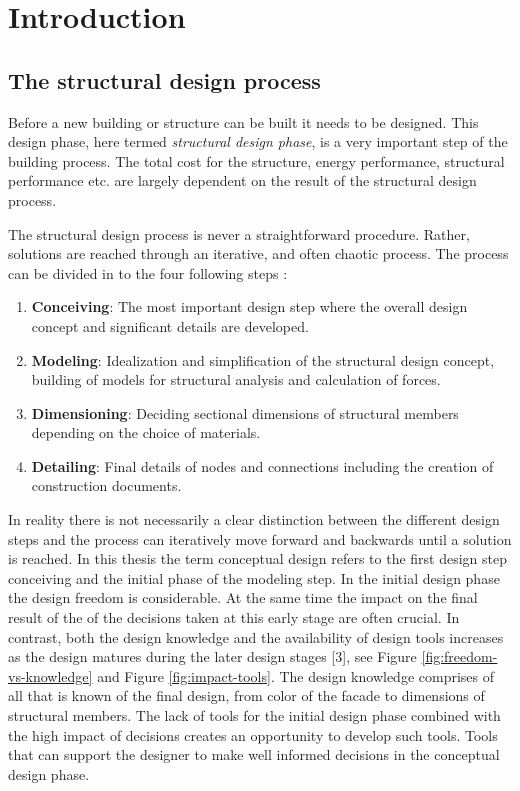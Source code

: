 \chapter{Introduction}
\label{ch:Introduction}
\section{The structural design process}
Before a new building or structure can be built it needs to be designed. This design phase, here termed \textit{structural design phase}, is a very important step of the building process. The total cost for the structure, energy performance, structural performance etc. are largely dependent on the result of the structural design process. 

The structural design process is never a straightforward procedure. Rather, solutions are reached through an iterative, and often chaotic process. The process can be divided in to the four following steps \cite{schlaich2006challenges}:

\begin{enumerate}  
\item \textbf{Conceiving}: The most important design step where the overall design concept and significant details are developed.
\item \textbf{Modeling}: Idealization and simplification of the structural design concept, building of models for structural analysis and calculation of forces.
\item \textbf{Dimensioning}: Deciding sectional dimensions of structural members depending on the choice of materials.
\item \textbf{Detailing}: Final details of nodes and connections including the creation of construction documents.
\end{enumerate}

In reality there is not necessarily a clear distinction between the different design steps and the process can iteratively move forward and backwards until a solution is reached. In this thesis the term conceptual design refers to the first design step conceiving and the initial phase of the modeling step. In the initial design phase the design freedom is considerable. At the same time the impact on the final result of the of the decisions taken at this early stage are often crucial. In contrast, both the design knowledge and the availability of design tools increases as the design matures during the later design stages \cite{schlaich2006challenges} [3], see Figure \ref{fig:freedom-vs-knowledge} and Figure \ref{fig:impact-tools}. The design knowledge comprises of all that is known of the final design, from color of the facade to dimensions of structural members. The lack of tools for the initial design phase combined with the high impact of decisions creates an opportunity to develop such tools. Tools that can support the designer to make well informed decisions in the conceptual design phase.

